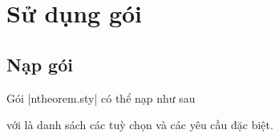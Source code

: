 \section{\texorpdfstring{Sử dụng gói}{Su dung goi}}


\subsection{\texorpdfstring{Nạp gói}{Nap goi}}

Gói |ntheorem.sty| có thể nạp như sau
\begin{command}
  \usepackage[`']{ntheorem}
\end{command}
với  là danh sách các tuỳ chọn và các yêu cầu đặc biệt.

